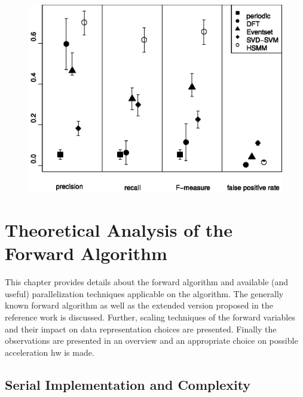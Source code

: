 \documentclass[mscthesis]{usiinfthesis}
\begin{document}
\begin{figure}
    \includegraphics[width=1\columnwidth]{./schema/results_salfner.eps}
    \caption{}
    \label{fig:results_salfner}
\end{figure}

\chapter{Theoretical Analysis of the Forward Algorithm}
\label{ch:analysis}
\glsresetall %

This chapter provides details about the forward algorithm and available (and
useful) parallelization techniques applicable on the algorithm. The generally
known forward algorithm as well as the extended version proposed in the
reference work is discussed. Further, scaling techniques of the forward
variables and their impact on data representation choices are presented.
Finally the observations are presented in an overview and an appropriate choice
on possible acceleration \gls{hw} is made.

\section{Serial Implementation and Complexity}
\label{ch:analysis_serial}
\end{document}
